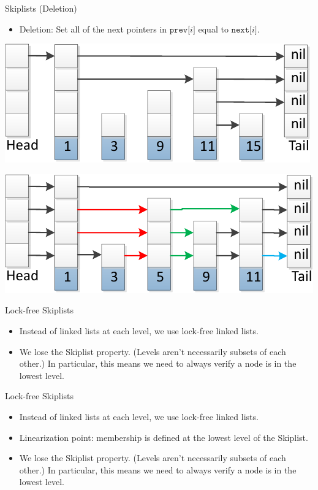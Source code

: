 \documentclass{beamer}
\begin{document}
\begin{frame}{Skiplists (Deletion)}
  \begin{itemize}
    \item Deletion: Set all of the next pointers in $\mathtt{prev[}i\mathtt{]}$ 
      equal to $\mathtt{next[}i\mathtt{]}$.
  \end{itemize}
  \begin{center}
    \includegraphics[scale=0.75]{img/skiplistSearch15-crop.pdf}
  \end{center}
  \begin{center}
    \includegraphics[scale=0.75]{img/skiplistInsert5-crop.pdf}
  \end{center}
\end{frame}

\begin{frame}{Lock-free Skiplists}
  \begin{itemize}
    \item Instead of linked lists at each level, we use lock-free linked lists.
    \item We lose the Skiplist property. (Levels aren't necessarily subsets of each other.) In particular,
      this means we need to always verify a node is in the lowest level.
  \end{itemize}
\end{frame}

\begin{frame}{Lock-free Skiplists}
  \begin{itemize}
    \item Instead of linked lists at each level, we use lock-free linked lists.
    \item Linearization point: membership is defined at the lowest level of the Skiplist.
    \item We lose the Skiplist property. (Levels aren't necessarily subsets of each other.) In particular,
      this means we need to always verify a node is in the lowest level.
  \end{itemize}
\end{frame}
\end{document}
